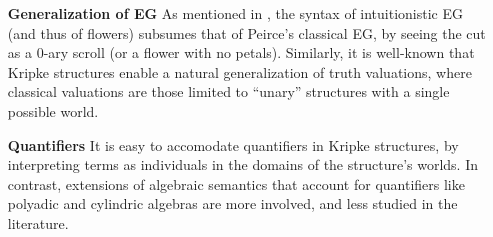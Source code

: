 \begin{itemize}
  \item[\textbf{Generalization of EG}]
    As mentioned in , the syntax of intuitionistic EG (and thus of
    flowers) subsumes that of Peirce's classical EG, by seeing the cut as a
    $0$-ary scroll (or a flower with no petals). Similarly, it is well-known
    that Kripke structures enable a natural generalization of truth valuations,
    where classical valuations are those limited to ``unary'' structures with a
    single possible world.
  
  \item[\textbf{Quantifiers}]
    It is easy to accomodate quantifiers in Kripke structures, by interpreting
    terms as individuals in the domains of the structure's worlds. In contrast,
    extensions of algebraic semantics that account for quantifiers like polyadic
    and cylindric algebras are more involved, and less studied in the
    literature.
  

\end{itemize}
